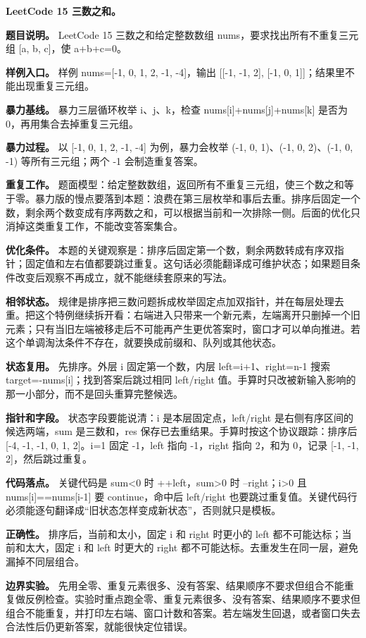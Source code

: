 \noindent\textbf{LeetCode 15 三数之和。}

\textbf{题目说明。} LeetCode 15 三数之和给定整数数组 nums，要求找出所有不重复三元组 [a, b, c]，使 a+b+c=0。

\textbf{样例入口。} 样例 nums=[-1, 0, 1, 2, -1, -4]，输出 [[-1, -1, 2], [-1, 0, 1]]；结果里不能出现重复三元组。

\textbf{暴力基线。} 暴力三层循环枚举 i、j、k，检查 nums[i]+nums[j]+nums[k] 是否为 0，再用集合去掉重复三元组。

\textbf{暴力过程。} 以 [-1, 0, 1, 2, -1, -4] 为例，暴力会枚举 (-1, 0, 1)、(-1, 0, 2)、(-1, 0, -1) 等所有三元组；两个 -1 会制造重复答案。

\textbf{重复工作。} 题面模型：给定整数数组，返回所有不重复三元组，使三个数之和等于零。暴力版的慢点要落到本题：浪费在第三层枚举和事后去重。排序后固定一个数，剩余两个数变成有序两数之和，可以根据当前和一次排除一侧。后面的优化只消掉这类重复工作，不能改变答案集合。

\textbf{优化条件。} 本题的关键观察是：排序后固定第一个数，剩余两数转成有序双指针；固定值和左右值都要跳过重复。这句话必须能翻译成可维护状态；如果题目条件改变后观察不再成立，就不能继续套原来的写法。

\textbf{相邻状态。} 规律是排序把三数问题拆成枚举固定点加双指针，并在每层处理去重。把这个特例继续拆开看：右端进入只带来一个新元素，左端离开只删掉一个旧元素；只有当旧左端被移走后不可能再产生更优答案时，窗口才可以单向推进。若这个单调淘汰条件不存在，就要换成前缀和、队列或其他状态。

\textbf{状态复用。} 先排序。外层 i 固定第一个数，内层 left=i+1、right=n-1 搜索 target=-nums[i]；找到答案后跳过相同 left/right 值。手算时只改被新输入影响的那一小部分，而不是回头重算完整候选。

\textbf{指针和字段。} 状态字段要能说清：i 是本层固定点，left/right 是右侧有序区间的候选两端，sum 是三数和，res 保存已去重结果。手算时按这个协议跟踪：排序后 [-4, -1, -1, 0, 1, 2]。i=1 固定 -1，left 指向 -1，right 指向 2，和为 0，记录 [-1, -1, 2]，然后跳过重复。

\textbf{代码落点。} 关键代码是 sum<0 时 ++left，sum>0 时 --right；i>0 且 nums[i]==nums[i-1] 要 continue，命中后 left/right 也要跳过重复值。关键代码行必须能逐句翻译成“旧状态怎样变成新状态”，否则就只是模板。

\textbf{正确性。} 排序后，当前和太小，固定 i 和 right 时更小的 left 都不可能达标；当前和太大，固定 i 和 left 时更大的 right 都不可能达标。去重发生在同一层，避免漏掉不同层组合。

\textbf{边界实验。} 先用全零、重复元素很多、没有答案、结果顺序不要求但组合不能重复做反例检查。实验时重点跑全零、重复元素很多、没有答案、结果顺序不要求但组合不能重复，并打印左右端、窗口计数和答案。若左端发生回退，或者窗口失去合法性后仍更新答案，就能很快定位错误。

